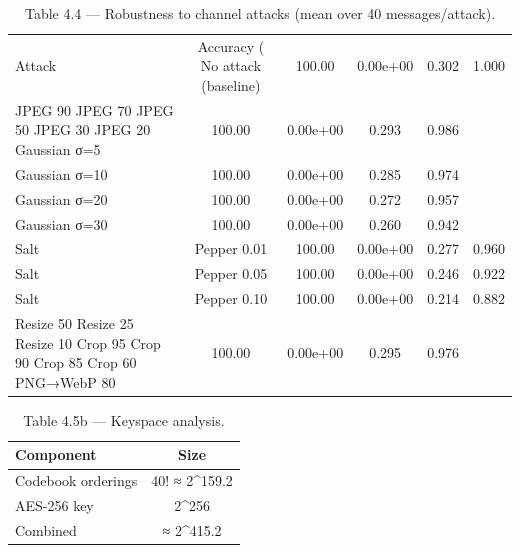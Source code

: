 \begin{table}[htbp]
\centering
\caption{Table 4.4 — Robustness to channel attacks (mean over 40 messages/attack).}
\label{tab:table_4_4_robustness}
\begin{tabular}{lcccc}
\hline
Attack & Accuracy (%
\hline
No attack (baseline) & 100.00 & 0.00e+00 & 0.302 & 1.000 \\
JPEG 90%
JPEG 70%
JPEG 50%
JPEG 30%
JPEG 20%
Gaussian σ=5 & 100.00 & 0.00e+00 & 0.293 & 0.986 \\
Gaussian σ=10 & 100.00 & 0.00e+00 & 0.285 & 0.974 \\
Gaussian σ=20 & 100.00 & 0.00e+00 & 0.272 & 0.957 \\
Gaussian σ=30 & 100.00 & 0.00e+00 & 0.260 & 0.942 \\
Salt & Pepper 0.01 & 100.00 & 0.00e+00 & 0.277 & 0.960 \\
Salt & Pepper 0.05 & 100.00 & 0.00e+00 & 0.246 & 0.922 \\
Salt & Pepper 0.10 & 100.00 & 0.00e+00 & 0.214 & 0.882 \\
Resize 50%
Resize 25%
Resize 10%
Crop 95%
Crop 90%
Crop 85%
Crop 60%
PNG→WebP 80 & 100.00 & 0.00e+00 & 0.295 & 0.976 \\
\hline
\end{tabular}
\end{table}


\begin{table}[htbp]
\centering
\caption{Table 4.5b — Keyspace analysis.}
\label{tab:table_4_5_keyspace}
\begin{tabular}{lc}
\hline
Component & Size \\
\hline
Codebook orderings & 40! ≈ 2^159.2 \\
AES-256 key & 2^256 \\
Combined & ≈ 2^415.2 \\
\hline
\end{tabular}
\end{table}


